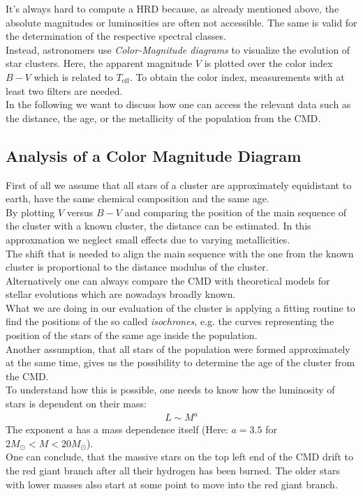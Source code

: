 It's always hard to compute a HRD because, as already mentioned above, the absolute magnitudes or luminosities are often not accessible. The same is valid for the determination of the respective spectral classes. \\
Instead, astronomers use \textit{Color-Magnitude diagrams} to visualize the evolution of star clusters. Here, the apparent magnitude $V$ is plotted over the color index $B-V$ which is related to $T_{\text{eff}}$.
To obtain the color index, measurements with at least two filters are needed. \\
In the following we want to discuss how one can access the relevant data such as the distance, the age, or the metallicity of the population from the CMD.
\subsection*{Analysis of a Color Magnitude Diagram}
First of all we assume that all stars of a cluster are approximately equidistant to earth, have the same chemical composition and the same age. \\
By plotting $V$ versus $B-V$ and comparing the position of the main sequence of the cluster with a known cluster, the distance can be estimated. In this approxmation we neglect small effects due to varying metallicities. \\
The shift that is needed to align the main sequence with the one from the known cluster is proportional to the distance modulus of the cluster. \\
Alternatively one can always compare the CMD with theoretical models for stellar evolutions which are nowadays broadly known. \\
What we are doing in our evaluation of the cluster is applying a fitting routine to find the positions of the so called \textit{isochrones}, e.g. the curves representing the position of the stars of the same age inside the population. \\
Another assumption, that all stars of the population were  formed approximately at the same time, gives us the possibility to determine the age of the cluster from the CMD. \\
To understand how this is possible, one needs to know how the luminosity of stars is dependent on their mass:
\begin{align}
	L \sim M^a
\end{align}
 The exponent $a$ has a mass dependence itself (Here: $a = 3.5 $ for $2M_{\odot} < M < 20M_{\odot}$). \\ One can conclude, that the massive stars on the top left end of the CMD drift to the red giant branch after all their hydrogen has been burned. The older stars with lower masses also start at some point to move into the red giant branch. \\
